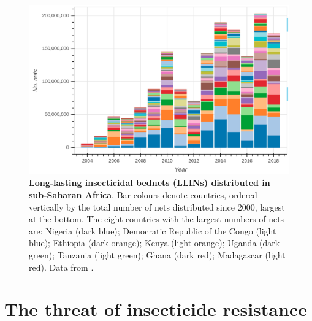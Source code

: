 \begin{refsection}
\begin{figure}[t!]
\begin{center}
\includegraphics*[width=1\linewidth,center]{artwork/chapter1/llins}
\end{center}
\caption{
%
\textbf{Long-lasting insecticidal bednets (LLINs) distributed in sub-Saharan Africa}.
%
Bar colours denote countries, ordered vertically by the total number of nets distributed since 2000, largest at the bottom.
%
The eight countries with the largest numbers of nets are: Nigeria (dark blue); Democratic Republic of the Congo (light blue); Ethiopia (dark orange); Kenya (light orange); Uganda (dark green); Tanzania (light green); Ghana (dark red); Madagascar (light red).
%
Data from \textcite{AMP2020}.
%
}
\label{fig:llins}
\end{figure}


\section{The threat of insecticide resistance}\label{sec:insecticide-resistance}



\end{refsection}

